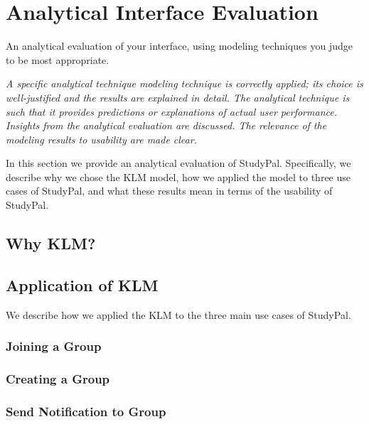 \documentclass[conference]{IEEEtran}
\begin{document}
\section{Analytical Interface Evaluation}
An analytical evaluation of your interface, using modeling techniques you judge to be most appropriate. 
 
\emph{A specific analytical technique modeling technique is correctly applied; its choice is well-justified and the results are explained in detail. The analytical technique is such that it provides predictions or explanations of actual user performance. Insights from the analytical evaluation are discussed. The relevance of the modeling results to usability are made clear.}

 
In this section we provide an analytical evaluation of StudyPal.
Specifically, we describe why we chose the KLM model, how we applied the model to three use cases of StudyPal, and what these results mean in terms of the usability of StudyPal.

\subsection{Why KLM?}


\subsection{Application of KLM}
We describe how we applied the KLM to the three main use cases of StudyPal.

\subsubsection{Joining a Group}

\subsubsection{Creating a Group}

\subsubsection{Send Notification to Group}
\end{document}
